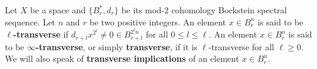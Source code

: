 Let $X$ be a space and $\{B^*_r,d_r\}$ be its mod-$2$ cohomology Bockstein spectral sequence. Let $n$ and $r$ be two positive integers. An element $x\in B^n_r$ is said to be {\bf $\ell$-transverse} if $d_{r+l}x^{2^l}\not=0\in B^{2^l n}_{r+l}$ for all $0\leq l\leq\ell$. An element $x\in B^n_r$ is said to be {\bf $\infty$-transverse}, or simply {\bf transverse}, if it is $\ell$-transverse for all $\ell\geq0$. We will also speak of {\bf transverse implications} of an element $x\in B^n_r$.
\endinput